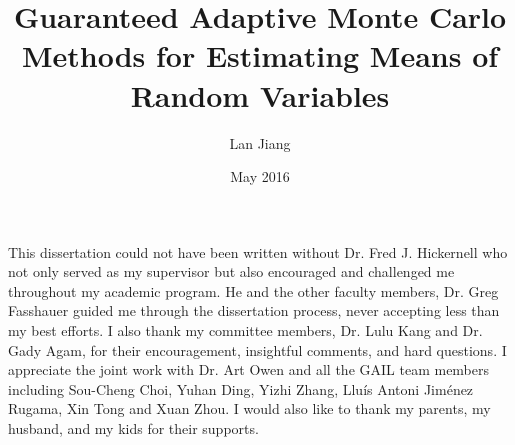 \documentclass{iitthesis}
\theoremstyle{definition}
\begin{document}

\title{Guaranteed Adaptive Monte Carlo Methods for Estimating Means of Random Variables}
\author{Lan Jiang}
 
\date{May 2016}
\maketitle                %


\prelimpages         %


\begin{acknowledgement}     %
\par  This dissertation could not have been written without Dr. Fred J. Hickernell who not only served as my supervisor but also encouraged and challenged me throughout my academic program. He and the other faculty members, Dr. Greg Fasshauer guided me through the dissertation process, never accepting less than my best efforts. I also thank my committee members, Dr. Lulu Kang and Dr. Gady Agam, for their encouragement, insightful comments, and hard questions. I appreciate the joint work with Dr. Art Owen and all the GAIL team members including Sou-Cheng Choi, Yuhan Ding, Yizhi Zhang, Llu{\'i}s Antoni Jim{\'e}nez Rugama, Xin Tong and Xuan Zhou. I would also like to thank my parents, my husband, and my kids for their supports.
\end{acknowledgement}


\tableofcontents
 \clearpage

\listoftables

\clearpage

\listoffigures

\clearpage
\end{document}
